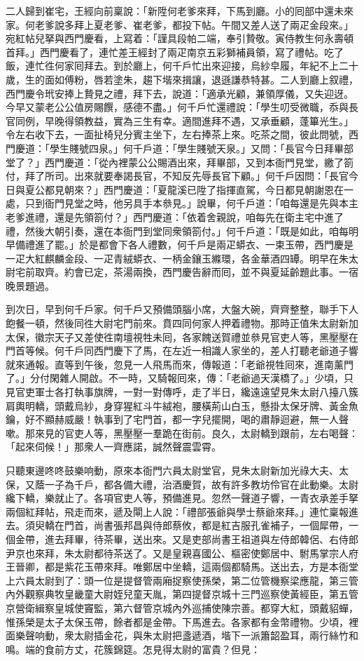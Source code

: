 二人歸到崔宅，王經向前稟說：「新陞何老爹來拜，下馬到廳。小的囘部中還未來家。何老爹說多拜上夏老爹、崔老爹，都投下帖。午間又差人送了兩疋金段來。」宛紅帖兒拏與西門慶看，上寫着：「謹具段帕二端，奉引贄敬。寅侍教生何永壽頓首拜。」西門慶看了，連忙差王經封了兩疋南京五彩獅補員領，寫了禮帖。吃了飯，連忙徃何家囘拜去。到於廳上，何千戶忙出來迎接，烏紗皁履，年紀不上二十歲，生的面如傅粉，唇若塗朱，趨下堦來揖讓，退遜謙恭特甚。二人到廳上叙禮，西門慶令玳安捧上贄見之禮，拜下去，說道：「適承光顧，兼領厚儀，又失迎迓。今早又蒙老公公值房賜饌，感德不盡。」何千戶忙還禮說：「學生叨受微職，忝與長官同例，早晚得領教益，實為三生有幸。適間進拜不遇，又承垂顧，蓬篳光生。」令左右收下去，一面扯椅兒分賓主坐下，左右捧茶上來。吃茶之間，彼此問號，西門慶道：「學生賤號四泉。」何千戶道：「學生賤號天泉。」又問：「長官今日拜畢部堂了？」西門慶道：「從內裡蒙公公賜酒出來，拜畢部，又到本衙門見堂，繳了箚付，拜了所司。出來就要奉謁長官，不知反先辱長官下顧。」何千戶因問：「長官今日與夏公都見朝來？」西門慶道：「夏龍溪已陞了指揮直駕，今日都見朝謝恩在一處，只到衙門見堂之時，他另具手本叅見。」說畢，何千戶道：「咱每還是先與本主老爹進禮，還是先領箚付？」西門慶道：「依着舍親說，咱每先在衛主宅中進了禮，然後大朝引奏，還在本衙門到堂同衆領箚付。」何千戶道：「既是如此，咱每明早備禮進了罷。」於是都會下各人禮數，何千戶是兩疋蟒衣、一束玉帶，西門慶是一疋大紅麒麟金段、一疋青絨蟒衣、一柄金鑲玉縧環，各金華酒四罈。明早在朱太尉宅前取齊。約會已定，茶湯兩換，西門慶告辭而囘，並不與夏延齡題此事。一宿晚景題過。

到次日，早到何千戶家。何千戶又預備頭腦小席，大盤大碗，齊齊整整，聯手下人飽餐一頓，然後同徃大尉宅門前來。賁四同何家人押着禮物。那時正值朱太尉新加太保，徽宗天子又差使徃南壇視牲未囘，各家餽送賀禮並叅見官吏人等，黑壓壓在門首等候。何千戶同西門慶下了馬，在左近一相識人家坐的，差人打聽老爺道子響就來通報。直等到午後，忽見一人飛馬而來，傳報道：「老爺視牲囘來，進南薰門了。」分付閑雜人開啟。不一時，又騎報囘來，傳：「老爺過天漢橋了。」少頃，只見官吏軍士各打執事旗牌，一對一對傳呼，走了半日，纔遠遠望見朱太尉八擡八簇肩輿明轎，頭戴烏紗，身穿猩紅斗牛絨袍，腰橫荊山白玉，懸掛太保牙牌、黃金魚鑰，好不顯赫威嚴！執事到了宅門首，都一字兒擺開，喝的肅靜迴避，無一人聲嗽。那來見的官吏人等，黑壓壓一羣跪在街前。良久，太尉轎到跟前，左右喝聲：「起來伺候！」那衆人一齊應諾，誠然聲震雲霄。

只聽東邊咚咚鼓樂响動，原來本衙門六員太尉堂官，見朱太尉新加光祿大夫、太保，又蔭一子為千戶，都各備大禮，治酒慶賀，故有許多教坊伶官在此動樂。太尉纔下轎，樂就止了。各項官吏人等，預備進見。忽然一聲道子響，一青衣承差手拏兩個紅拜帖，飛走而來，遞及閘上人說：「禮部張爺與學士蔡爺來拜。」連忙稟報進去。須臾轎在門首，尚書張邦昌與侍郎蔡攸，都是紅吉服孔雀補子，一個犀帶，一個金帶，進去拜畢，待茶畢，送出來。又是吏部尚書王祖道與左侍郎韓侶、右侍郎尹京也來拜，朱太尉都待茶送了。又是皇親喜國公、樞密使鄭居中、駙馬掌宗人府王晉卿，都是紫花玉帶來拜。唯鄭居中坐轎，這兩個都騎馬。送出去，方是本衙堂上六員太尉到了：頭一位是提督管兩廂捉察使孫榮，第二位管機察梁應龍，第三管內外觀察典牧皇畿童大尉姪兒童天胤，第四提督京城十三門巡察使黃經臣，第五管京營衛緝察皇城使竇監，第六督管京城內外巡捕使陳宗善。都穿大紅，頭戴貂蟬，惟孫榮是太子太保玉帶，餘者都是金帶。下馬進去。各家都有金幣禮物。{}少頃，裡面樂聲响動，衆太尉插金花，與朱太尉把盞遞酒，堦下一派簫韶盈耳，兩行絲竹和鳴。端的食前方丈，花簇錦筵。怎見得太尉的富貴？但見：

